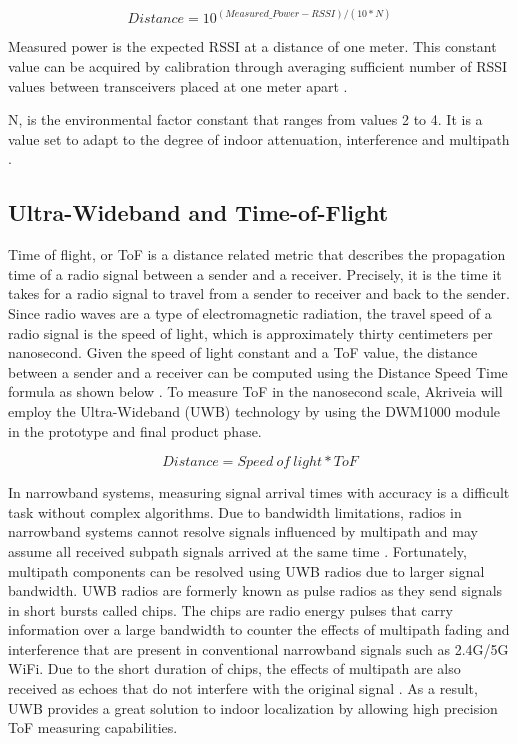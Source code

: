 \begin{equation*}
    Distance = 10^{(Measured\_Power - RSSI)/(10*N)}
\end{equation*}

\medskip
Measured power is the expected RSSI at a distance of one meter. This constant value can be acquired by calibration through averaging sufficient number of RSSI values between transceivers placed at one meter apart \cite{R2-5-3}.

\bigskip
N, is the environmental factor constant that ranges from values 2 to 4. It is a value set to adapt to the degree of indoor attenuation, interference and multipath \cite{R2-5-3}.

\medskip
\subsection{Ultra-Wideband and Time-of-Flight}
\medskip
Time of flight, or ToF is a distance related metric that describes the propagation time of a radio signal between a sender and a receiver. Precisely, it is the time it takes for a radio signal to travel from a sender to receiver and back to the sender. Since radio waves are a type of electromagnetic radiation, the travel speed of a radio signal is the speed of light, which is approximately thirty centimeters per nanosecond. Given the speed of light constant and a ToF value, the distance between a sender and a receiver can be computed using the Distance Speed Time formula as shown below \cite{R2-5-1}. To measure ToF in the nanosecond scale, Akriveia will employ the Ultra-Wideband (UWB) technology by using the DWM1000 module in the prototype and final product phase.

\begin{equation*}
    Distance = Speed\:of\:light * ToF
\end{equation*}

In narrowband systems, measuring signal arrival times with accuracy is a difficult task without complex algorithms. Due to bandwidth limitations, radios in narrowband systems cannot resolve signals influenced by multipath and may assume all received subpath signals arrived at the same time \cite{R2-5-2}. Fortunately, multipath components can be resolved using UWB radios due to larger signal bandwidth. UWB radios are formerly known as pulse radios as they send signals in short bursts called chips. The chips are radio energy pulses that carry information over a large bandwidth to counter the effects of multipath fading and interference that are present in conventional narrowband signals such as 2.4G/5G WiFi. Due to the short duration of chips, the effects of multipath are also received as echoes that do not interfere with the original signal \cite{R2-5-1}. As a result, UWB provides a great solution to indoor localization by allowing high precision ToF measuring capabilities.



